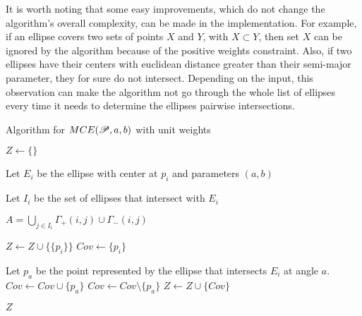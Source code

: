 It is worth noting that some easy improvements, which do not change the algorithm's overall complexity, can be made in the implementation. For example, if an ellipse covers two sets of points $X$ and $Y$, with $X \subset Y$, then set $X$ can be ignored by the algorithm because of the positive weights constraint. Also, if two ellipses have their centers with euclidean distance greater than their semi-major parameter, they for sure do not intersect. Depending on the input, this observation can make the algorithm not go through the whole list of ellipses every time it needs to determine the ellipses pairwise intersections.

\renewcommand{\algorithmicrequire}{\textbf{Input:}}
\renewcommand{\algorithmicensure}{\textbf{Output:}}

\begin{algoritmo}
\caption{Algorithm for $MCE(\mathscr{P}, a, b)$ with unit weights}\label{algoritmo:mce1}

\begin{algorithmic}[1]
\State $Z \gets \{\}$ 

\State Let $E_i$ be the ellipse with center at $p_i$ and parameters $(a,b)$

\State Let $I_i$ be the set of ellipses that intersect with $E_i$

\State $A = \bigcup_{j \in I_i} \Gamma_+(i,j) \cup \Gamma_-(i,j)$

\State $Z \gets Z \cup \{\{p_i\}\}$
\State $Cov \gets \{p_i\}$ 

 
\State Let $p_a$ be the point represented by the ellipse that intersects $E_i$ at angle $a$. 
\State $Cov \gets Cov \cup \{p_a\}$
\Else
\State $Cov \gets Cov \setminus \{p_a\}$
\EndIf
\State $Z \gets Z \cup \{Cov\}$
\EndFor
\EndFor
\EndFor

\State \Return $Z$
\EndProcedure


\end{algorithmic}
\end{algoritmo}

